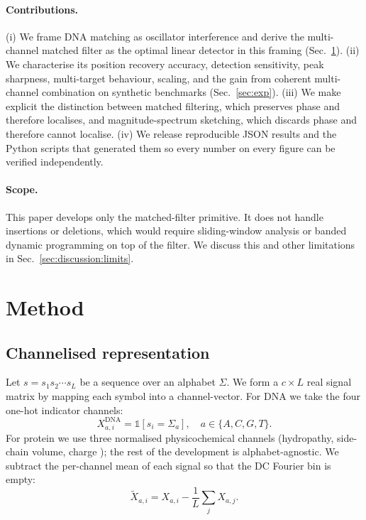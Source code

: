 \documentclass[twocolumn,11pt,a4paper]{article}
\theoremstyle{definition}
\theoremstyle{remark}
\begin{document}
\paragraph{Contributions.} (i) We frame DNA matching as oscillator
interference and derive the multi-channel matched filter as the
optimal linear detector in this framing
(Sec.~\ref{sec:method}). (ii) We characterise its position recovery
accuracy, detection sensitivity, peak sharpness, multi-target
behaviour, scaling, and the gain from coherent multi-channel
combination on synthetic benchmarks
(Sec.~\ref{sec:exp}). (iii) We make explicit the
distinction between matched filtering, which preserves phase and
therefore localises, and magnitude-spectrum sketching, which discards
phase and therefore cannot localise. (iv) We release reproducible
JSON results and the Python scripts that generated them so every
number on every figure can be verified independently.

\paragraph{Scope.} This paper develops only the matched-filter primitive.
It does not handle insertions or deletions, which would require
sliding-window analysis or banded dynamic programming on top of the
filter. We discuss this and other limitations in
Sec.~\ref{sec:discussion:limits}.

\section{Method}
\label{sec:method}

\subsection{Channelised representation}

Let $s = s_1 s_2 \cdots s_L$ be a sequence over an alphabet $\Sigma$. We
form a $c \times L$ real signal matrix by mapping each symbol into a
channel-vector. For DNA we take the four one-hot indicator channels:
\begin{equation}
    X^{\text{DNA}}_{a, i} = \mathbb{1}[s_i = \Sigma_a], \quad a \in \{A, C, G, T\}.
\end{equation}
For protein we use three normalised physicochemical channels
(hydropathy, side-chain volume, charge \citep{kyte1982}); the rest of
the development is alphabet-agnostic. We subtract the per-channel mean
of each signal so that the DC Fourier bin is empty:
\begin{equation}
    \tilde X_{a, i} = X_{a, i} - \frac{1}{L}\sum_j X_{a,j}.
\end{equation}
\end{document}
